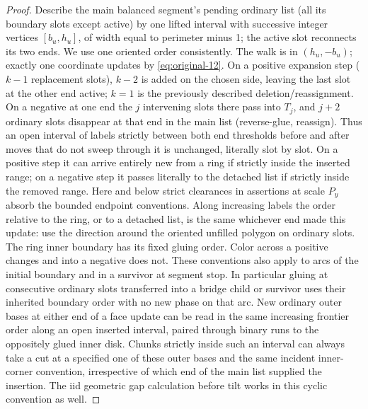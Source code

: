 \begin{proof}

Describe the main balanced segment's pending ordinary list (all its boundary slots except
active) by one lifted interval with successive integer vertices \([b_u,h_u]\), of width
equal to perimeter minus 1; the active slot reconnects its two ends. We use one oriented
order consistently. The walk is in \((h_u,-b_u)\); exactly one coordinate updates by
\eqref{eq:original-12}. On a positive expansion step (\(k-1\) replacement slots), \(k-2\)
is added on the chosen side, leaving the last slot at the other end active; \(k=1\) is the
previously described deletion/reassignment. On a negative at one end the \(j\) intervening
slots there pass into \(T_j\), and \(j+2\) ordinary slots disappear at that end in the
main list (reverse-glue, reassign). Thus an open interval of labels strictly between both
end thresholds before and after moves that do not sweep through it is unchanged, literally
slot by slot. On a positive step it can arrive entirely new from a ring if strictly inside
the inserted range; on a negative step it passes literally to the detached list if
strictly inside the removed range. Here and below strict clearances in assertions at scale
\(P_y\) absorb the bounded endpoint conventions. Along increasing labels the order
relative to the ring, or to a detached list, is the same whichever end made this update:
use the direction around the oriented unfilled polygon on ordinary slots. The ring inner
boundary has its fixed gluing order. Color across a positive changes and into a negative
does not. These conventions also apply to arcs of the initial boundary and in a survivor
at segment stop. In particular gluing at consecutive ordinary slots transferred into a
bridge child or survivor uses their inherited boundary order with no new phase on that
arc. New ordinary outer bases at either end of a face update can be read in the same
increasing frontier order along an open inserted interval, paired through binary runs to
the oppositely glued inner disk. Chunks strictly inside such an interval can always take a
cut at a specified one of these outer bases and the same incident inner-corner convention,
irrespective of which end of the main list supplied the insertion. The iid geometric gap
calculation before tilt works in this cyclic convention as well.

\end{proof}

